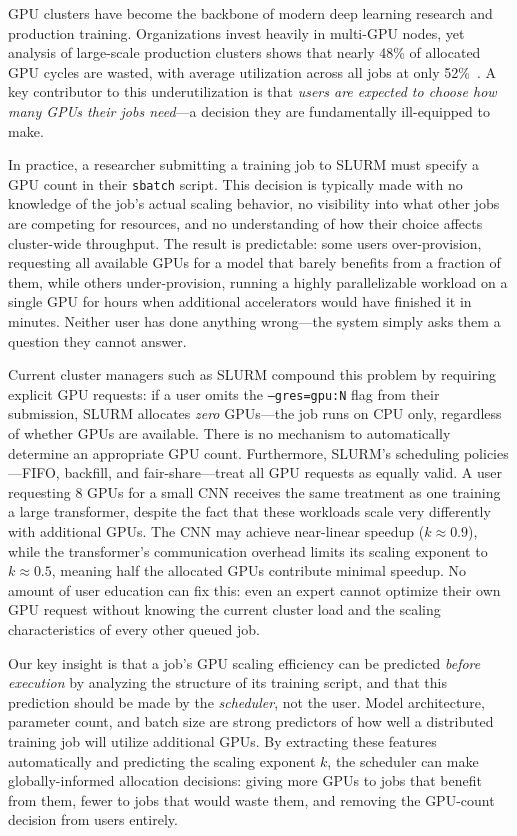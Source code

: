\documentclass[letterpaper,10pt]{article}
\begin{document}
GPU clusters have become the backbone of modern deep learning research and production training. Organizations invest heavily in multi-GPU nodes, yet analysis of large-scale production clusters shows that nearly 48\% of allocated GPU cycles are wasted, with average utilization across all jobs at only 52\%~\cite{jeon2019analysis}. A key contributor to this underutilization is that \textit{users are expected to choose how many GPUs their jobs need}---a decision they are fundamentally ill-equipped to make.

In practice, a researcher submitting a training job to SLURM must specify a GPU count in their \texttt{sbatch} script. This decision is typically made with no knowledge of the job's actual scaling behavior, no visibility into what other jobs are competing for resources, and no understanding of how their choice affects cluster-wide throughput. The result is predictable: some users over-provision, requesting all available GPUs for a model that barely benefits from a fraction of them, while others under-provision, running a highly parallelizable workload on a single GPU for hours when additional accelerators would have finished it in minutes. Neither user has done anything wrong---the system simply asks them a question they cannot answer.

Current cluster managers such as SLURM compound this problem by requiring explicit GPU requests: if a user omits the \texttt{--gres=gpu:N} flag from their submission, SLURM allocates \textit{zero} GPUs---the job runs on CPU only, regardless of whether GPUs are available. There is no mechanism to automatically determine an appropriate GPU count. Furthermore, SLURM's scheduling policies---FIFO, backfill, and fair-share---treat all GPU requests as equally valid. A user requesting 8 GPUs for a small CNN receives the same treatment as one training a large transformer, despite the fact that these workloads scale very differently with additional GPUs. The CNN may achieve near-linear speedup ($k \approx 0.9$), while the transformer's communication overhead limits its scaling exponent to $k \approx 0.5$, meaning half the allocated GPUs contribute minimal speedup. No amount of user education can fix this: even an expert cannot optimize their own GPU request without knowing the current cluster load and the scaling characteristics of every other queued job.

Our key insight is that a job's GPU scaling efficiency can be predicted \textit{before execution} by analyzing the structure of its training script, and that this prediction should be made by the \textit{scheduler}, not the user. Model architecture, parameter count, and batch size are strong predictors of how well a distributed training job will utilize additional GPUs. By extracting these features automatically and predicting the scaling exponent $k$, the scheduler can make globally-informed allocation decisions: giving more GPUs to jobs that benefit from them, fewer to jobs that would waste them, and removing the GPU-count decision from users entirely.
\end{document}
